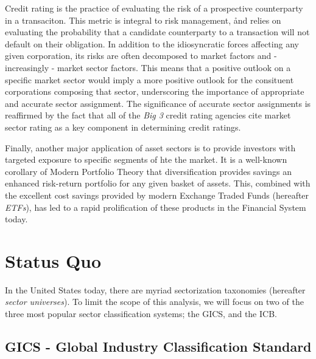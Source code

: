 \documentclass[../main.tex]{subfiles}
\begin{document}
Credit rating is the practice of evaluating the risk of a prospective counterparty in a transaciton. This metric is integral to risk management, ånd relies on evaluating the probability that a candidate counterparty to a transaction will not default on their obligation. In addition to the idiosyncratic forces affecting any given corporation, its risks are often decomposed to market factors and - increasingly - market sector factors. This means that a positive outlook on a specific market sector would imply a more positive outlook for the consituent corporations composing that sector, underscoring the importance of appropriate and accurate sector assignment. The significance of accurate sector assignments is reaffirmed by the fact that all of the \textit{Big 3} credit rating agencies cite market sector rating as a key component in determining credit ratings.

Finally, another major application of asset sectors is to provide investors with targeted exposure to specific segments of hte the market. It is a well-known corollary of Modern Portfolio Theory that diversification provides savings an enhanced risk-return portfolio for any given basket of assets. This, combined with the excellent cost savings provided by modern Exchange Traded Funds (hereafter \textit{ETFs}), has led to a rapid prolification of these products in the Financial System today.

\section{Status Quo} \label{introduction:status_quo}

In the United States today, there are myriad sectorization taxonomies (hereafter \textit{sector universes}). To limit the scope of this analysis, we will focus on two of the three most popular sector classification systems; the GICS, and the ICB.

\subsection{GICS - Global Industry Classification Standard}
\end{document}
